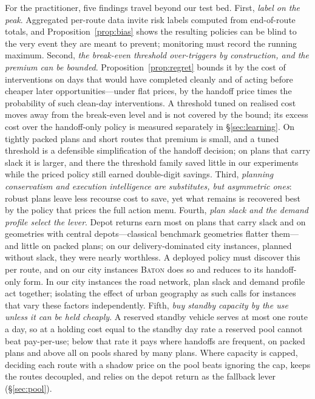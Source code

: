 \documentclass[preprint,authoryear,12pt]{elsarticle}
\theoremstyle{definition}
\theoremstyle{remark}
\begin{document}
For the practitioner, five findings travel beyond our test bed. First,
\emph{label on the peak}. Aggregated per-route data invite risk labels
computed from end-of-route totals, and Proposition~\ref{prop:bias}
shows the resulting policies can be blind to the very event they are
meant to prevent; monitoring must record the running maximum. Second,
\emph{the break-even threshold over-triggers by construction, and the
premium can be bounded}. Proposition~\ref{prop:regret} bounds it by the
cost of interventions on days that would have completed cleanly and of
acting before cheaper later opportunities---under flat prices, by the
handoff price times the probability of such clean-day interventions.
A threshold tuned on realised cost moves away from the break-even level
and is not covered by the bound; its excess cost over the handoff-only
policy is measured separately in \S\ref{sec:learning}. On tightly packed plans and short routes that premium
is small, and a tuned threshold is a defensible simplification of the
handoff decision; on plans that carry slack it is larger, and there the
threshold family saved little in our experiments while the priced
policy still earned double-digit savings. Third, \emph{planning
conservatism and execution intelligence are substitutes, but asymmetric
ones}: robust plans leave less recourse cost to save, yet what remains
is recovered best by the policy that prices the full
action menu. Fourth, \emph{plan slack and the demand profile select the
lever}. Depot returns earn most on plans that carry slack and on
geometries with central depots---classical benchmark geometries flatter
them---and little on packed plans; on our delivery-dominated city
instances, planned without slack, they were nearly worthless. A deployed
policy must discover this per route, and on our city instances
\textsc{Baton} does so and reduces to its handoff-only form. In our city
instances the road network, plan slack and demand profile act together;
isolating the effect of urban geography as such calls for instances
that vary these factors independently. Fifth, \emph{buy standby capacity by the use unless it can be held
cheaply}. A reserved standby vehicle serves at most one route a day, so
at a holding cost equal to the standby day rate a reserved pool cannot
beat pay-per-use; below that rate it pays where handoffs are frequent,
on packed plans and above all on pools shared by many plans. Where
capacity is capped, deciding each route with a shadow price on the pool
beats ignoring the cap, keeps the routes decoupled, and relies on the
depot return as the fallback lever (\S\ref{sec:pool}).
\end{document}
